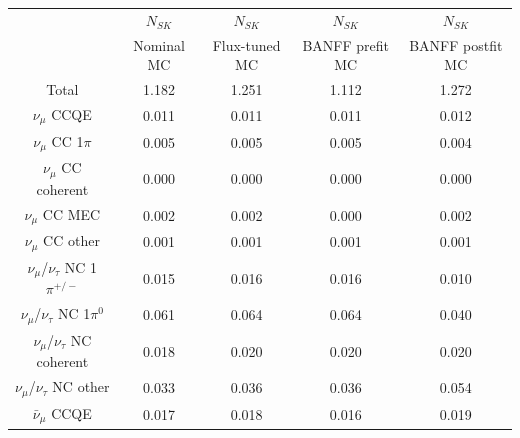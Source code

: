 
\begin{table}


\begin{tabular} { | c ||c | c | c | c |  | }
\hline
                                                  & $N_{SK}$            & $N_{SK}$            & $N_{SK}$            & $N_{SK}$             \\ 
                                                  & Nominal MC          & Flux-tuned MC       & BANFF prefit MC     & BANFF postfit MC     \\ \hline 
Total                                             & 1.182               & 1.251               & 1.112               & 1.272                \\ \hline 
\hline 
$\nu_\mu$ CCQE                                    & 0.011               & 0.011               & 0.011               & 0.012                \\ \hline 
$\nu_\mu$ CC 1$\pi$                               & 0.005               & 0.005               & 0.005               & 0.004                \\ \hline 
$\nu_\mu$ CC coherent                             & 0.000               & 0.000               & 0.000               & 0.000                \\ \hline 
$\nu_\mu$ CC MEC                                  & 0.002               & 0.002               & 0.000               & 0.002                \\ \hline 
$\nu_\mu$ CC other                                & 0.001               & 0.001               & 0.001               & 0.001                \\ \hline 
$\nu_\mu$/$\nu_\tau$ NC 1$\pi^{+/-}$              & 0.015               & 0.016               & 0.016               & 0.010                \\ \hline 
$\nu_\mu$/$\nu_\tau$ NC 1$\pi^0$                  & 0.061               & 0.064               & 0.064               & 0.040                \\ \hline 
$\nu_\mu$/$\nu_\tau$ NC coherent                  & 0.018               & 0.020               & 0.020               & 0.020                \\ \hline 
$\nu_\mu$/$\nu_\tau$ NC other                     & 0.033               & 0.036               & 0.036               & 0.054                \\ \hline 
$\bar{\nu}_\mu$ CCQE                              & 0.017               & 0.018               & 0.016               & 0.019                \\ \hline 

\end{tabular}
\end{table}
